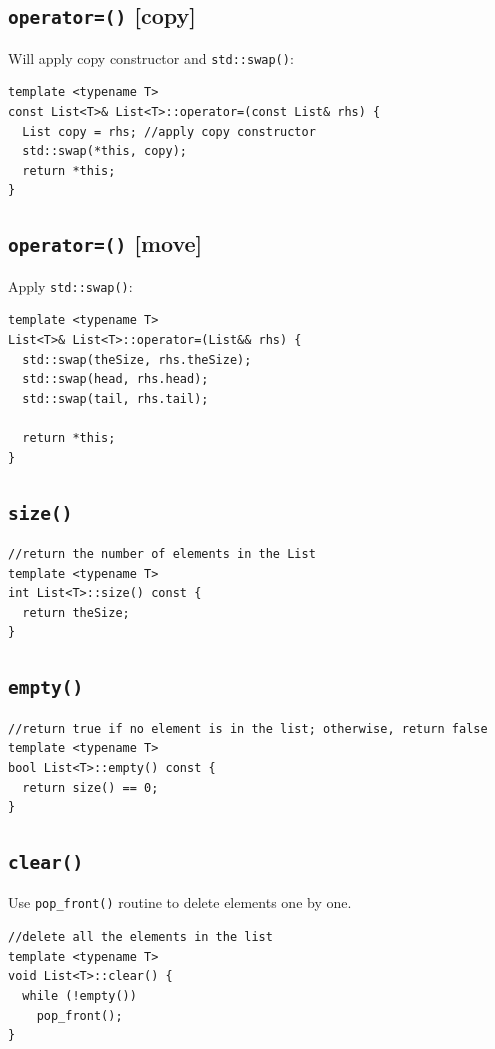 \documentclass[11pt]{book}
\begin{document}
\subsection{\texttt{operator=()} [copy]}
\label{sec:org1706bc2}
Will apply copy constructor and \texttt{std::swap()}:
\begin{verbatim}
template <typename T>
const List<T>& List<T>::operator=(const List& rhs) {
  List copy = rhs; //apply copy constructor
  std::swap(*this, copy);
  return *this;
}
\end{verbatim}
\subsection{\texttt{operator=()} [move]}
\label{sec:org9f07473}
Apply \texttt{std::swap()}:
\begin{verbatim}
template <typename T>
List<T>& List<T>::operator=(List&& rhs) {
  std::swap(theSize, rhs.theSize);
  std::swap(head, rhs.head);
  std::swap(tail, rhs.tail);

  return *this;
}
\end{verbatim}
\subsection{\texttt{size()}}
\label{sec:orgd9bf3ca}
\begin{verbatim}
//return the number of elements in the List
template <typename T>
int List<T>::size() const {
  return theSize;
}
\end{verbatim}
\subsection{\texttt{empty()}}
\label{sec:orgf9ee40f}
\begin{verbatim}
//return true if no element is in the list; otherwise, return false
template <typename T>
bool List<T>::empty() const {
  return size() == 0;
}
\end{verbatim}
\subsection{\texttt{clear()}}
\label{sec:orgd50e324}
Use \texttt{pop\_front()} routine to delete elements one by one.
\begin{verbatim}
//delete all the elements in the list
template <typename T>
void List<T>::clear() {
  while (!empty())
    pop_front();
}
\end{verbatim}
\end{document}
